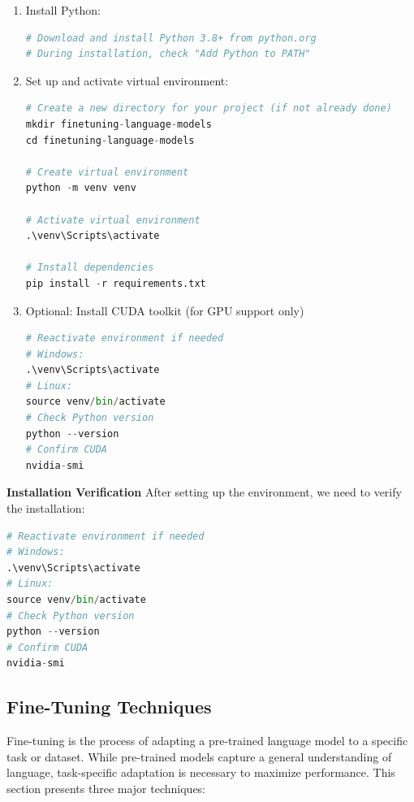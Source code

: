 \begin{enumerate}
\item Install Python:

\begin{lstlisting}[language=Python, caption=Download Python, basicstyle=\ttfamily\footnotesize, keywordstyle=\color{blue}]
# Download and install Python 3.8+ from python.org
# During installation, check "Add Python to PATH"
\end{lstlisting}
\item Set up and activate virtual environment:
\begin{lstlisting}[language=Python, caption=Virtual env, basicstyle=\ttfamily\footnotesize, keywordstyle=\color{blue}]
# Create a new directory for your project (if not already done)
mkdir finetuning-language-models
cd finetuning-language-models

# Create virtual environment
python -m venv venv

# Activate virtual environment
.\venv\Scripts\activate

# Install dependencies
pip install -r requirements.txt
\end{lstlisting}
\item Optional: Install CUDA toolkit (for GPU support only)
\begin{lstlisting}[language=Python, caption=CUDA, basicstyle=\ttfamily\footnotesize, keywordstyle=\color{blue}]
# Reactivate environment if needed
# Windows:
.\venv\Scripts\activate
# Linux:
source venv/bin/activate
# Check Python version
python --version
# Confirm CUDA
nvidia-smi
\end{lstlisting}
\end{enumerate}

\textbf{Installation Verification}
After setting up the environment, we need to verify the installation:
\begin{lstlisting}[language=Python, caption=Verification, basicstyle=\ttfamily\footnotesize, keywordstyle=\color{blue}]
# Reactivate environment if needed
# Windows:
.\venv\Scripts\activate
# Linux:
source venv/bin/activate
# Check Python version
python --version
# Confirm CUDA
nvidia-smi
\end{lstlisting}



\subsection{Fine-Tuning Techniques}

Fine-tuning is the process of adapting a pre-trained language model to a specific task or dataset. While pre-trained models capture a general understanding of language, task-specific adaptation is necessary to maximize performance. This section presents three major techniques:

